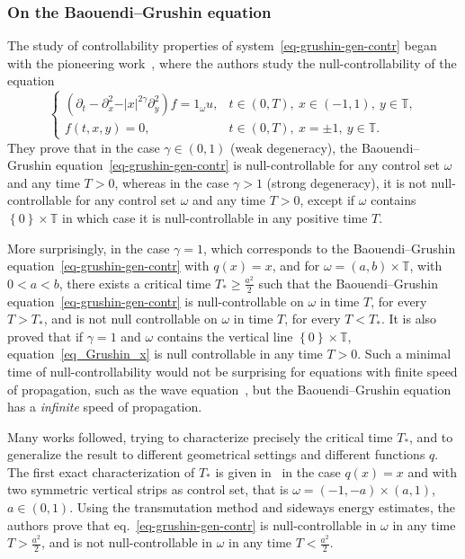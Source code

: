 \documentclass[10pt]{amsart}
\theoremstyle{definition}\newtheorem{defi}[theo]{Definition}\newtheorem{rema}[theo]{Remark}\newtheorem{exam}[theo]{Example}\newtheorem{exem}[theo]{Example}\newtheorem{nota}[theo]{Notation}
\renewcommand{\geq}{\geqslant}
\newcommand{\1}{\mathds 1}
\newcommand{\T}{\mathbb{T}}
\renewcommand{\o}{\omega}
\begin{document}
\subsubsection{On the Baouendi--Grushin equation}

The study of controllability properties of system~\eqref{eq-grushin-gen-contr} began with the pioneering work~\cite{BCG14}, where the authors study the null-controllability of the equation
\begin{equation}\label{eq_Grushin_x}
\left\{
\begin{array}{ll}
\left(\partial_t - \partial^2_{x} - \vert x\vert^{2\gamma} \partial^2_y\right) f = 1_\omega u, & t\in (0,T), \ x\in (-1,1),\ y \in \T,\\
f(t,x,y) = 0, & t \in (0,T), \ x = \pm 1, \ y \in \T.
\end{array}\right.
\end{equation}
They prove that in the case $\gamma \in (0,1)$ (weak degeneracy), the Baouendi--Grushin equation~\eqref{eq-grushin-gen-contr} is null-controllable for any control set $\o$ and any time $T>0$, whereas in the case $\gamma>1$ (strong degeneracy), it is not null-controllable for any control set $\omega$ and any time $T>0$, except if $\o$ contains $\left\lbrace 0 \right\rbrace \times \T$ in which case it is null-controllable in any positive time $T$.

More surprisingly, in the case $\gamma = 1$, which corresponds to the Baouendi--Grushin equation~\eqref{eq-grushin-gen-contr} with $q(x) = x$, and for $\omega = (a,b) \times \T$, with $0<a<b$, there exists a critical time $T_* \geq \frac{a^2}{2}$ such that the Baouendi--Grushin equation~\eqref{eq-grushin-gen-contr} is null-controllable on $\o$ in time $T$, for every $T> T_*$, and is not null controllable on $\o$ in time $T$, for every $T < T_*$. It is also proved that if $\gamma = 1$ and $\o$ contains the vertical line $\left\lbrace 0 \right\rbrace \times \T $, equation~\eqref{eq_Grushin_x} is null controllable in any time $T>0$. Such a minimal time of null-controllability would not be surprising for equations with finite speed of propagation, such as the wave equation~\cite{BLR92}, but the Baouendi--Grushin equation has a \emph{infinite} speed of propagation.

Many works followed, trying to characterize precisely the critical time $T_*$, and to generalize the result to different geometrical settings and different functions $q$. The first exact characterization of $T_*$ is given in~\cite{BMM15} in the case $q(x) = x$ and with two symmetric vertical strips as control set, that is $\o = (-1, - a) \times (a,1)$, $a \in (0,1)$. Using the transmutation method and sideways energy estimates, the authors prove that eq.~\eqref{eq-grushin-gen-contr} is null-controllable in $\o$ in any time $T> \frac{a^2}{2}$, and is not null-controllable in $\o$ in any time $T<\frac{a^2}{2}$.
\end{document}
